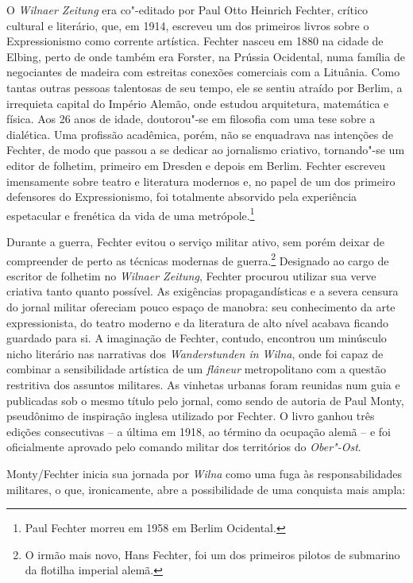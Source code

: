 O \textit{Wilnaer Zeitung} era co"-editado por Paul Otto Heinrich Fechter,
crítico cultural e literário, que, em 1914, escreveu um dos primeiros
livros sobre o Expressionismo como corrente artística. Fechter nasceu em
1880 na cidade de Elbing, perto de onde também era Forster, na Prússia
Ocidental, numa família de negociantes de madeira com estreitas conexões
comerciais com a Lituânia. Como tantas outras pessoas talentosas de seu
tempo, ele se sentiu atraído por Berlim, a irrequieta capital do Império
Alemão, onde estudou arquitetura, matemática e física. Aos 26 anos de
idade, doutorou"-se em filosofia com uma tese sobre a dialética. Uma
profissão acadêmica, porém, não se enquadrava nas intenções de Fechter,
de modo que passou a se dedicar ao jornalismo criativo, tornando"-se um
editor de folhetim, primeiro em Dresden e depois em Berlim. Fechter
escreveu imensamente sobre teatro e literatura modernos e, no papel de
um dos primeiro defensores do Expressionismo, foi totalmente absorvido
pela experiência espetacular e frenética da vida de uma
metrópole.\footnote{Paul Fechter morreu em 1958 em Berlim Ocidental.}

Durante a guerra, Fechter evitou o serviço militar ativo, sem porém
deixar de compreender de perto as técnicas modernas de guerra.\footnote{O irmão
mais novo, Hans Fechter, foi um dos primeiros pilotos de submarino da
flotilha imperial alemã.} Designado ao cargo de escritor de folhetim no
\textit{Wilnaer Zeitung}, Fechter procurou utilizar sua verve criativa
tanto quanto possível. As exigências propagandísticas e a severa censura
do jornal militar ofereciam pouco espaço de manobra: seu conhecimento da
arte expressionista, do teatro moderno e da literatura de alto nível
acabava ficando guardado para si. A imaginação de Fechter, contudo,
encontrou um minúsculo nicho literário nas narrativas dos
\textit{Wanderstunden in Wilna}, onde foi capaz de combinar a sensibilidade
artística de um \textit{flâneur} metropolitano com a questão restritiva
dos assuntos militares. As vinhetas urbanas foram reunidas num guia e
publicadas sob o mesmo título pelo jornal, como sendo de autoria de Paul
Monty, pseudônimo de inspiração inglesa utilizado por Fechter. O livro
ganhou três edições consecutivas -- a última em 1918, ao término da
ocupação alemã -- e foi oficialmente aprovado pelo comando militar dos
territórios do \textit{Ober"-Ost}.

Monty/Fechter inicia sua jornada por \textit{Wilna} como uma fuga às
responsabilidades militares, o que, ironicamente, abre a possibilidade
de uma conquista mais ampla:


